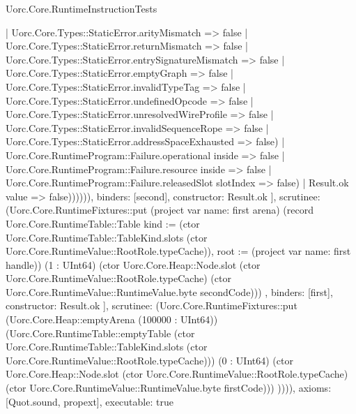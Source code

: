\begin{lexlean}{Uorc.Core.RuntimeInstructionTests}
\begin{semanticmodule}
{{{{{                              | Uorc.Core.Types::StaticError.arityMismatch => false
                              | Uorc.Core.Types::StaticError.returnMismatch => false
                              | Uorc.Core.Types::StaticError.entrySignatureMismatch => false
                              | Uorc.Core.Types::StaticError.emptyGraph => false
                              | Uorc.Core.Types::StaticError.invalidTypeTag => false
                              | Uorc.Core.Types::StaticError.undefinedOpcode => false
                              | Uorc.Core.Types::StaticError.unresolvedWireProfile => false
                              | Uorc.Core.Types::StaticError.invalidSequenceRope => false
                              | Uorc.Core.Types::StaticError.addressSpaceExhausted => false)
                            | Uorc.Core.RuntimeProgram::Failure.operational inside => false
                            | Uorc.Core.RuntimeProgram::Failure.resource inside => false
                            | Uorc.Core.RuntimeProgram::Failure.releasedSlot slotIndex => false)
                          | Result.ok value => false)))))),
                  binders: [second],
                  constructor: Result.ok
                }
              ],
              scrutinee: (Uorc.Core.RuntimeFixtures::put (project var{
                name: first
              } arena) (record Uorc.Core.RuntimeTable::Table {kind := (ctor Uorc.Core.RuntimeTable::TableKind.slots (ctor Uorc.Core.RuntimeValue::RootRole.typeCache)), root := (project var{
                name: first
              } handle)}) (1 : UInt64) (ctor Uorc.Core.Heap::Node.slot (ctor Uorc.Core.RuntimeValue::RootRole.typeCache) (ctor Uorc.Core.RuntimeValue::RuntimeValue.byte secondCode)))
            },
            binders: [first],
            constructor: Result.ok
          }
        ],
        scrutinee: (Uorc.Core.RuntimeFixtures::put (Uorc.Core.Heap::emptyArena (100000 : UInt64)) (Uorc.Core.RuntimeTable::emptyTable (ctor Uorc.Core.RuntimeTable::TableKind.slots (ctor Uorc.Core.RuntimeValue::RootRole.typeCache))) (0 : UInt64) (ctor Uorc.Core.Heap::Node.slot (ctor Uorc.Core.RuntimeValue::RootRole.typeCache) (ctor Uorc.Core.RuntimeValue::RuntimeValue.byte firstCode)))
      })))),
  axioms: [Quot.sound, propext],
  executable: true
}


\end{semanticmodule}
\end{lexlean}
